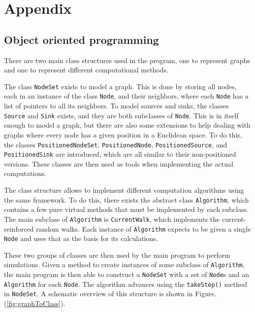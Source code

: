 \section{Appendix}
\label{sec:appendix}

\subsection{Object oriented programming}

There are two main class structures used in the program, one to represent graphs and one to represent different computational methods.

The class \texttt{NodeSet} exists to model a graph. This is done by storing all nodes, each in an instance of the class \texttt{Node}, and their neighbors, where each \texttt{Node} has a list of pointers to all its neighbors. To model sources and sinks, the classes \texttt{Source} and \texttt{Sink} exists, and they are both subclasses of \texttt{Node}. This is in itself enough to model a graph, but there are also some extensions to help dealing with graphs where every node has a given position in a Euclidean space. To do this, the classes \texttt{PositionedNodeSet}, \texttt{PositionedNode}, \texttt{PositionedSource}, and \texttt{PositionedSink} are introduced, which are all similar to their non-positioned versions. These classes are then used as tools when implementing the actual computations.

The class structure allows to implement different computation algorithms using the same framework. To do this, there exists the abstract class \texttt{Algorithm}, which contains a few pure virtual methods that must be implemented by each subclass. The main subclass of \texttt{Algorithm} is \texttt{CurrentWalk}, which implements the current-reinforced random walks. Each instance of \texttt{Algorithm} expects to be given a single \texttt{Node} and uses that as the basis for its calculations.

These two groups of classes are then used by the main program to perform simulations. Given a method to create instances of some subclass of \texttt{Algorithm}, the main program is then able to construct a \texttt{NodeSet} with a set of \texttt{Node}s and an \texttt{Algorithm} for each \texttt{Node}. The algorithm advances using the \texttt{takeStep()} method in \texttt{NodeSet}. A schematic overview of this structure is shown in Figure. (\ref{fig:graphToClass}).

